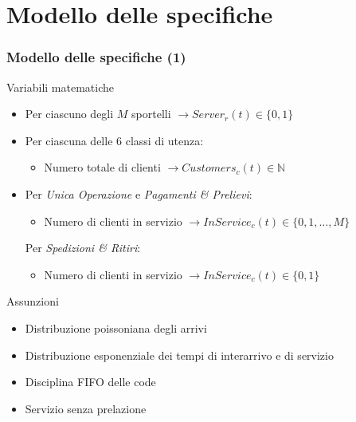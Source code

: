 \documentclass[
	usepdftitle=false,
	xcolor={table, dvipsnames},
	hyperref={
		pdftitle={Studio delle prestazioni di un Ufficio Postale ispirato a Poste Italiane},
    	pdfauthor={A. Chillotti, C. Cuffaro e S. Tiberi}
    }
]{beamer}
\newcommand{\uo}{\textsl{Unica Operazione}}
\newcommand{\pp}{\textsl{Pagamenti \& Prelievi}}
\newcommand{\sr}{\textsl{Spedizioni \& Ritiri}}
\begin{document}
\section{Modello delle specifiche}
\begin{frame}
\frametitle{Modello delle specifiche (1)}
\begin{block}{Variabili matematiche}
\begin{itemize}
\item Per ciascuno degli $M$ sportelli $\to Server_r(t) \in \lbrace 0, 1 \rbrace$
\item Per ciascuna delle 6 classi di utenza:
\begin{itemize}
\item Numero totale di clienti $\to Customers_c(t) \in \mathbb{N}$
\end{itemize}  
\item Per \uo{} e \pp{}:
\begin{itemize}
\item Numero di clienti in servizio $\to InService_c(t) \in \lbrace 0, 1, \dots, M \rbrace$
\end{itemize} 
Per \sr{}:
\begin{itemize}
\item Numero di clienti in servizio $\to InService_c(t) \in \lbrace 0, 1 \rbrace$
\end{itemize}
\end{itemize}
\end{block}

\begin{block}{Assunzioni}
\begin{itemize}
\item Distribuzione poissoniana degli arrivi
\item Distribuzione esponenziale dei tempi di interarrivo e di servizio
\item Disciplina FIFO delle code
\item Servizio senza prelazione
\end{itemize}
\end{block}
\end{frame}
\end{document}
